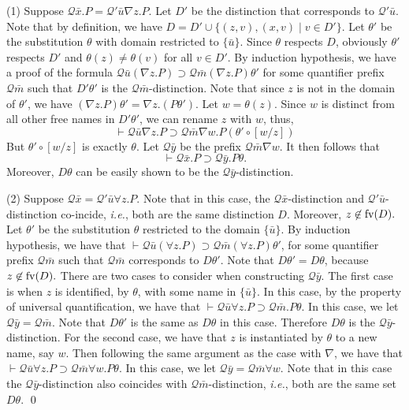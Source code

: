 \documentclass{acmtrans2m}
\newcommand{\ie}{{\em i.e.}}
\def\Qscr{{\mathcal Q}}
\newcommand{\fv}[1]{{\rm fv}(#1)}
\newcommand{\oimp}{\supset}
\begin{document}
\noindent (1) Suppose $\Qscr \bar x. P = \Qscr' \bar u \nabla z. P.$
Let $D'$ be the distinction that corresponds to $\Qscr' \bar u.$
Note that by definition, we have
$D = D' \cup \{(z, v), (x, v) \mid v \in D' \}$.
Let $\theta'$ be the substitution $\theta$ with domain restricted to $\{ \bar u\}.$
Since $\theta$ respects $D$, obviously $\theta'$ respects $D'$ and 
$\theta(z) \not = \theta(v)$ for all $v \in D'.$ By induction hypothesis, we have
a proof of the formula
$\Qscr \bar u (\nabla z. P) \oimp \Qscr \bar m (\nabla z.P)\theta'$ 
for some quantifier prefix $\Qscr \bar m$ such that
$D'\theta'$ is the $\Qscr \bar m$-distinction.
Note that since $z$ is not in the domain of $\theta'$, 
we have $(\nabla z.P)\theta' = \nabla z.(P\theta').$
Let $w = \theta(z).$ Since $w$ is distinct from all other free names in
$D'\theta'$, we can rename $z$ with $w$, thus, 
$$
\vdash \Qscr \bar u \nabla z.P \oimp \Qscr \bar m \nabla w.P(\theta' \circ [w/z])
$$
But $\theta' \circ [w/z]$ is exactly $\theta$. Let $\Qscr \bar y$ be the
prefix $\Qscr \bar m\nabla w.$ It then follows that 
$$
\vdash \Qscr \bar x.P \oimp \Qscr \bar y.P\theta.
$$
Moreover, $D\theta$ can be easily shown to be the $\Qscr \bar y$-distinction.

\noindent(2) Suppose $\Qscr \bar x = \Qscr' \bar u \forall z.P.$
Note that in this case, the $\Qscr \bar x$-distinction and
$\Qscr' \bar u$-distinction co-incide, \ie, both are the same
distinction $D.$ Moreover, $z \not \in \fv{D}.$
Let $\theta'$ be the substitution $\theta$ restricted to the domain
$\{\bar u \}.$
By induction hypothesis, we have that 
$\vdash \Qscr \bar u (\forall z.P) \oimp \Qscr \bar m (\forall z.P)\theta'$,
for some quantifier prefix $\Qscr \bar m$ 
such that $\Qscr \bar m$ corresponds to $D\theta'.$
Note that $D\theta' = D\theta$, because $z \not \in \fv D.$
There are two cases to consider when constructing $\Qscr \bar y.$
The first case is when $z$ is identified, by $\theta$, with
some name in $\{\bar u \}.$ In this case, by the property of 
universal quantification, we have that 
$\vdash \Qscr \bar u \forall z.P \oimp \Qscr \bar m.P \theta$.
In this case, we let $\Qscr \bar y = \Qscr \bar m.$
Note that $D\theta'$ is the same as $D\theta$ in this case.
Therefore $D\theta$ is the $\Qscr \bar y$-distinction. 
For the second case, we have that $z$ is instantiated by $\theta$
to a new name, say $w$. 
Then following the same argument as the case with $\nabla$, we have that
$\vdash \Qscr \bar u \forall z.P \oimp \Qscr \bar m \forall w.P\theta$.
In this case, we let $\Qscr \bar y = \Qscr \bar m \forall w.$
Note that in this case the $\Qscr \bar y$-distinction also coincides
with $\Qscr \bar m$-distinction, \ie, both are the same set
$D\theta.$ \qed
\end{document}
